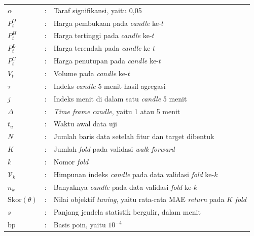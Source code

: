\begin{longtable}{@{}p{3cm}@{}p{0.6cm}@{}p{\dimexpr\textwidth-3.6cm\relax}@{}}
  $\alpha$ & : & Taraf signifikansi, yaitu 0,05 \\
  $P^{O}_t$ & : & Harga pembukaan pada \textit{candle} ke-$t$ \\
  $P^{H}_t$ & : & Harga tertinggi pada \textit{candle} ke-$t$ \\
  $P^{L}_t$ & : & Harga terendah pada \textit{candle} ke-$t$ \\
  $P^{C}_t$ & : & Harga penutupan pada \textit{candle} ke-$t$ \\
  $V_t$ & : & Volume pada \textit{candle} ke-$t$ \\
  $\tau$ & : & Indeks \textit{candle} 5 menit hasil agregasi \\
  $j$ & : & Indeks menit di dalam satu \textit{candle} 5 menit \\
  $\Delta$ & : & \textit{Time frame} \textit{candle}, yaitu 1 atau 5 menit \\
  $t_u$ & : & Waktu awal data uji \\
  $N$ & : & Jumlah baris data setelah fitur dan target dibentuk \\
  $K$ & : & Jumlah \textit{fold} pada validasi \textit{walk-forward} \\
  $k$ & : & Nomor \textit{fold} \\
  $\mathcal{V}_k$ & : & Himpunan indeks \textit{candle} pada data validasi
    \textit{fold} ke-$k$ \\
  $n_k$ & : & Banyaknya \textit{candle} pada data validasi \textit{fold} ke-$k$ \\
  $\mathrm{Skor}(\theta)$ & : & Nilai objektif \textit{tuning}, yaitu rata-rata
    MAE \textit{return} pada $K$ \textit{fold} \\
  $s$ & : & Panjang jendela statistik bergulir, dalam menit \\
  bp & : & Basis poin, yaitu $10^{-4}$ \\
\end{longtable}
\endgroup
\clearpage
